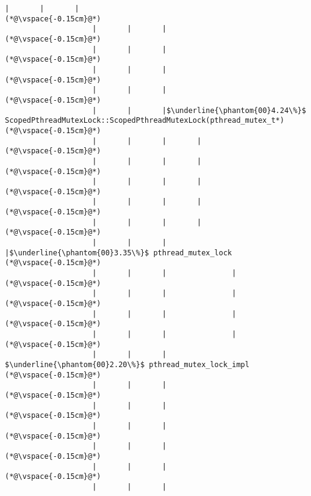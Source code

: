 \begin{lstlisting}[caption=Metodikutsu C$\to$Java 20 int-parametrilla, label=profile:C2JBenchmark00146, numberbychapter=true, frame=lines, float, floatplacement=t]
                    |       |       |
(*@\vspace{-0.15cm}@*)
                    |       |       |
(*@\vspace{-0.15cm}@*)
                    |       |       |
(*@\vspace{-0.15cm}@*)
                    |       |       |
(*@\vspace{-0.15cm}@*)
                    |       |       |
(*@\vspace{-0.15cm}@*)
                    |       |       |$\underline{\phantom{00}4.24\%}$ ScopedPthreadMutexLock::ScopedPthreadMutexLock(pthread_mutex_t*)
(*@\vspace{-0.15cm}@*)
                    |       |       |       |
(*@\vspace{-0.15cm}@*)
                    |       |       |       |
(*@\vspace{-0.15cm}@*)
                    |       |       |       |
(*@\vspace{-0.15cm}@*)
                    |       |       |       |
(*@\vspace{-0.15cm}@*)
                    |       |       |       |
(*@\vspace{-0.15cm}@*)
                    |       |       |       |$\underline{\phantom{00}3.35\%}$ pthread_mutex_lock
(*@\vspace{-0.15cm}@*)
                    |       |       |               |
(*@\vspace{-0.15cm}@*)
                    |       |       |               |
(*@\vspace{-0.15cm}@*)
                    |       |       |               |
(*@\vspace{-0.15cm}@*)
                    |       |       |               |
(*@\vspace{-0.15cm}@*)
                    |       |       |                $\underline{\phantom{00}2.20\%}$ pthread_mutex_lock_impl
(*@\vspace{-0.15cm}@*)
                    |       |       |        
(*@\vspace{-0.15cm}@*)
                    |       |       |        
(*@\vspace{-0.15cm}@*)
                    |       |       |
(*@\vspace{-0.15cm}@*)
                    |       |       |
(*@\vspace{-0.15cm}@*)
                    |       |       |
(*@\vspace{-0.15cm}@*)
                    |       |       |

\end{lstlisting}
